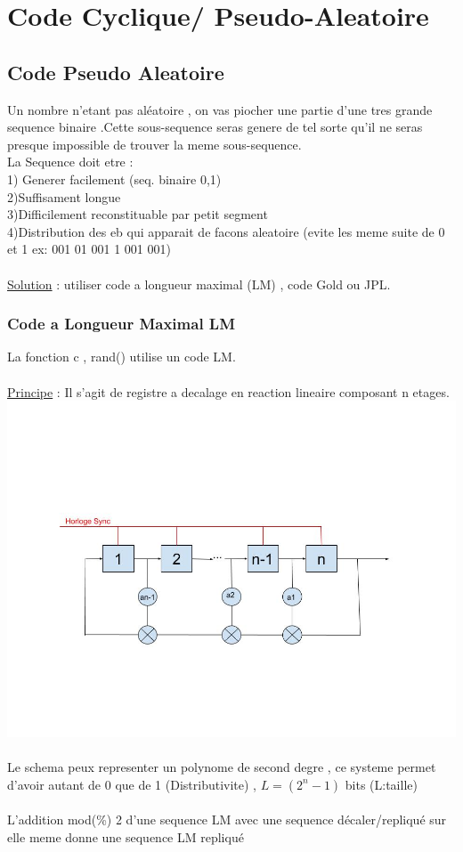 \documentclass[a4paper,8pt,openany]{book}
\begin{document}
\chapter{Code Cyclique/ Pseudo-Aleatoire}

\section{Code Pseudo Aleatoire}

Un nombre n'etant pas al\'eatoire , on vas piocher une partie d'une tres grande sequence binaire .Cette sous-sequence seras genere de tel sorte qu'il ne seras presque impossible de trouver la meme sous-sequence.\\
La Sequence doit etre : \\
1) Generer facilement (seq. binaire 0,1)\\
2)Suffisament longue\\
3)Difficilement reconstituable par petit segment\\
4)Distribution des eb qui apparait de facons aleatoire (evite les meme suite de 0 et 1 ex: 001 01 001 1 001 001)\\
\\
\underline{Solution} : utiliser code a longueur maximal (LM) , code Gold ou JPL.\\

\subsection{Code a Longueur Maximal LM}
La fonction c , rand() utilise un code LM.\\
\\
\underline{Principe} : Il s'agit de registre a decalage en reaction lineaire composant n etages.\\
\includegraphics[width=0.75\linewidth,center]{img/code_LM.jpg}\\
\\
Le schema peux representer un polynome de second degre , ce systeme permet d'avoir autant de 0 que de 1 (Distributivite) , $L=(2^n-1)$ bits (L:taille)\\
\\
L'addition mod(\%) 2 d'une sequence LM avec une sequence d\'ecaler/repliqu\'e sur elle meme donne \Rightarrow une sequence LM repliqu\'e\\
\end{document}
